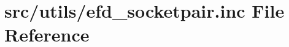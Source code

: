 \hypertarget{efd__socketpair_8inc}{}\section{src/utils/efd\+\_\+socketpair.inc File Reference}
\label{efd__socketpair_8inc}

